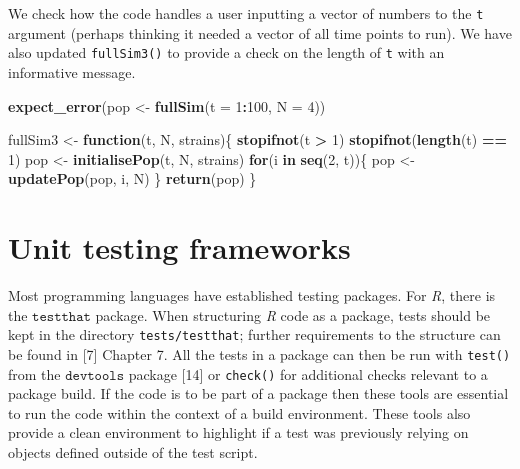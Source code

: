 \documentclass[10pt,letterpaper]{article}
\newenvironment{Shaded}{\begin{snugshade}}{\end{snugshade}}
\newcommand{\ControlFlowTok}[1]{\textcolor[rgb]{0.13,0.29,0.53}{\textbf{#1}}}
\newcommand{\DataTypeTok}[1]{\textcolor[rgb]{0.13,0.29,0.53}{#1}}
\newcommand{\DecValTok}[1]{\textcolor[rgb]{0.00,0.00,0.81}{#1}}
\newcommand{\KeywordTok}[1]{\textcolor[rgb]{0.13,0.29,0.53}{\textbf{#1}}}
\newcommand{\NormalTok}[1]{#1}
\newcommand{\OperatorTok}[1]{\textcolor[rgb]{0.81,0.36,0.00}{\textbf{#1}}}
\newcommand{\StringTok}[1]{\textcolor[rgb]{0.31,0.60,0.02}{#1}}
\begin{document}
We check how the code handles a user inputting a vector of numbers to the \texttt{t} argument (perhaps thinking it needed a vector of all time points to run).
We have also updated \texttt{fullSim3()} to provide a check on the length of \texttt{t} with an informative message.
\newline
{}\label{wrong1}

\begin{Shaded}
\begin{Highlighting}[]
\KeywordTok{expect_error}\NormalTok{(pop <-}\StringTok{ }\KeywordTok{fullSim}\NormalTok{(}\DataTypeTok{t =} \DecValTok{1}\OperatorTok{:}\DecValTok{100}\NormalTok{, }\DataTypeTok{N =} \DecValTok{4}\NormalTok{))}

\NormalTok{fullSim3 <-}\StringTok{ }\ControlFlowTok{function}\NormalTok{(t, N, strains)\{}
  \KeywordTok{stopifnot}\NormalTok{(t }\OperatorTok{>}\StringTok{ }\DecValTok{1}\NormalTok{)}
  \KeywordTok{stopifnot}\NormalTok{(}\KeywordTok{length}\NormalTok{(t) }\OperatorTok{==}\StringTok{ }\DecValTok{1}\NormalTok{)}
\NormalTok{  pop <-}\StringTok{ }\KeywordTok{initialisePop}\NormalTok{(t, N, strains) }
  \ControlFlowTok{for}\NormalTok{(i }\ControlFlowTok{in} \KeywordTok{seq}\NormalTok{(}\DecValTok{2}\NormalTok{, t))\{}
\NormalTok{    pop <-}\StringTok{ }\KeywordTok{updatePop}\NormalTok{(pop, i, N)}
\NormalTok{  \}}
  \KeywordTok{return}\NormalTok{(pop)}
\NormalTok{\}}
\end{Highlighting}
\end{Shaded}

\hypertarget{frameworks}{%
\section{Unit testing frameworks}\label{frameworks}}

Most programming languages have established testing packages.
For \emph{R}, there is the \(\texttt{testthat}\) package.
When structuring \emph{R} code as a package, tests should be kept in the directory \texttt{tests/testthat}; further requirements to the structure can be found in {[}7{]} Chapter 7.
All the tests in a package can then be run with \texttt{test()} from the \(\texttt{devtools}\) package {[}14{]} or \texttt{check()} for additional checks relevant to a package build.
If the code is to be part of a package then these tools are essential to run the code within the context of a build environment.
These tools also provide a clean environment to highlight if a test was previously relying on objects defined outside of the test script.
\end{document}
